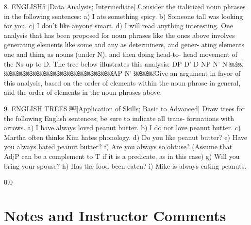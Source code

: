 \documentclass[11pt,notitlepage]{article}
\begin{document}
8. ENGLISH5
[Data Analysis; Intermediate]
Consider the italicized noun phrases in the following sentences:
a) I ate something spicy.
b) Someone tall was looking for you.
c) I don’t like anyone smart.
d) I will read anything interesting.
One analysis that has been proposed for noun phrases like the ones above involves generating elements like some and any as determiners, and gener- ating elements one and thing as nouns (under N), and then doing head-to- head movement of the Ns up to D. The tree below illustrates this analysis:
DP
D'
D NP
N'
N
￼￼￼￼￼￼￼￼￼￼￼￼￼￼￼￼￼￼AP
N'
￼￼￼Give an argument in favor of this analysis, based on the order of
elements within the noun phrase in general, and the order of elements
in the noun phrases above.


9. ENGLISH TREES
￼[Application of Skills; Basic to Advanced]
Draw trees for the following English sentences; be sure to indicate all trans- formations with arrows.
a) I have always loved peanut butter.
b) I do not love peanut butter.
c) Martha often thinks Kim hates phonology.
d) Do you like peanut butter?
e) Have you always hated peanut butter?
f) Are you always so obtuse? (Assume that AdjP can be a complement to
T if it is a predicate, as in this case)
g) Will you bring your spouse?
h) Has the food been eaten?
i) Mike is always eating peanuts.

\newpage
  {\setlength{\baselineskip}%
           {0.0\baselineskip}
  \section*{Notes and Instructor Comments}
  \hrulefill \par}
\end{document}
